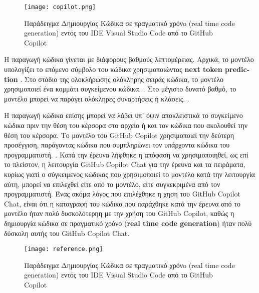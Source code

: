 \begin{figure}[H]
  \begin{center}
    \texttt{[image: copilot.png]}
    \label{fig:codeGen}
    \caption{Παράδειγμα Δημιουργίας Κώδικα σε πραγματικό χρόνo
      \textlatin{(real time code generation)} εντός του \textlatin{IDE}
      \textlatin{Visual Studio Code} από το \textlatin{GitHub Copilot }
    }
  \end{center}
\end{figure}

H παραγωγή κώδικα γίνεται με διάφορους βαθμούς λεπτομέρειας. Αρχικά, το
μοντέλο υπολογίζει το επόμενο σύμβολο του κώδικα χρησιμοποιώντας
\textlatin{\textbf{next token prediction}} \cite{Izadi2022,Kim2021,Wang2021,Feng2020,Ciniselli2021b,Ciniselli2021a}.
Στο στάδιο της ολοκλήρωσης ολόκληρης σειράς κώδικα, το μοντέλο
χρησιμοποιεί ένα κομμάτι συγκείμενου κώδικα.
\cite{Izadi2022,Guo2022,Svyatkovskiy2020,Lu2021}. Στο μέγιστο δυνατό
βαθμό, το μοντέλο μπορεί να παράγει ολόκληρες συναρτήσεις ή κλάσεις.
\cite{fried2023incoder,Guo2022,githubcopilot}.

Η παραγωγή κώδικα επίσης μπορεί να λάβει υπ' όψιν αποκλειστικά το
συγκείμενο κώδικα πριν την θέση του κέρσορα στο αρχείο ή και τον κώδικα
που ακολουθεί την θέση του κέρσορα. \cite{izadi2024language} Το μοντέλο
του \textlatin{GitHub Copilot} χρησιμοποιεί την δεύτερη προσέγγιση,
παράγοντας κώδικα που συμπληρώνει τον υπάρχοντα κώδικα του
προγραμματιστή. \cite{githubcopilot,fried2023incoder, wang2021codet5}.
Κατά την έρευνα λήφθηκε η απόφαση να χρησιμοποιηθεί, ως επί το πλείστον,
η λειτουργία \textlatin{GitHub Copilot Chat} για την έρευνα και τα
πειράματα, κυρίως γιατί ο σύγκειμενος κώδικας που χρησιμοποιεί το
μοντέλο κατά την λειτουργία αύτη, μπορεί να επιλεχθεί είτε από το
μοντέλο, είτε συγκεκριμένα από τον προγραμματιστή. Ένας ακόμα λόγος που
επιλέχθηκε η χηση του \textlatin{GitHub Copilot Chat}, είναι ότι η
καταγραφή του κώδικα που παράχθηκε κατά την έρευνα από το μοντέλο ήταν
πολύ δυσκολότερηη με την χρήση του \textlatin{GitHub Copilot}, καθώς η
δημιουργία κώδικα σε πραγματικό χρόνο \textlatin{(\textbf{real time code
    generation})} ήταν πολύ δύσκολη αυτής του \textlatin{GitHub Copilot
  Chat}.

\begin{figure}[H]
  \begin{center}
    \texttt{[image: reference.png]}
    \label{fig:reference}
    \caption{Παράδειγμα Δημιουργίας Κώδικα σε πραγματικό χρόνo
      \textlatin{(real time code generation)} εντός του \textlatin{IDE}
      \textlatin{Visual Studio Code} από το \textlatin{GitHub Copilot }
    }
  \end{center}
\end{figure}
